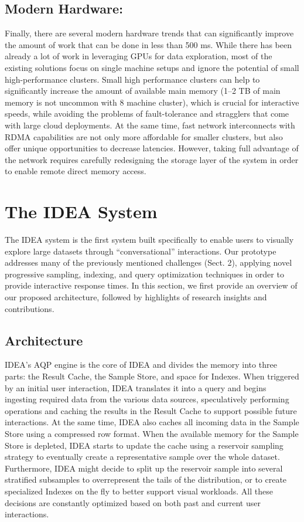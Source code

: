 \documentclass[12pt,letterpaper, onecolumn]{exam}
\begin{document}
    \subsection{Modern Hardware:} Finally, there are several modern hardware trends that can significantly improve the amount of work that can be done in less than 500 ms. While there has been already a lot of work in leveraging GPUs for data exploration, most of the existing solutions focus on single machine setups and ignore the potential of small high-performance clusters. Small high performance clusters can help to significantly increase the amount of available main memory (1–2 TB of main memory is not uncommon with 8 machine cluster), which is crucial for interactive speeds, while avoiding the problems of fault-tolerance and stragglers that come with large cloud deployments. At the same time, fast network interconnects with RDMA capabilities are not only more affordable for smaller clusters, but also offer unique opportunities to decrease latencies. However, taking full advantage of the network requires carefully redesigning the storage layer of the system in order to enable remote direct memory access.
    
    \section{The IDEA System}
    
    The IDEA system is the first system built specifically to enable users to visually explore large datasets through “conversational” interactions. Our prototype addresses many of the previously mentioned challenges (Sect. 2), applying novel progressive sampling, indexing, and query optimization techniques in order to provide interactive response times. In this section, we first provide an overview of our proposed architecture, followed by highlights of research insights and contributions.
    
    \subsection{Architecture}
    
    IDEA’s AQP engine is the core of IDEA and divides the memory into three parts: the Result Cache, the Sample Store, and space for Indexes. When triggered by an initial user interaction, IDEA translates it into a query and begins ingesting required data from the various data sources, speculatively performing operations and caching the results in the Result Cache to support possible future interactions. At the same time, IDEA also caches all incoming data in the Sample Store using a compressed row format. When the available memory for the Sample Store is depleted, IDEA starts to update the cache using a reservoir sampling strategy to eventually create a representative sample over the whole dataset. Furthermore, IDEA might decide to split up the reservoir sample into several stratified subsamples to overrepresent the tails of the distribution, or to create specialized Indexes on the fly to better support visual workloads. All these decisions are constantly optimized based on both past and current user interactions.
\end{document}
